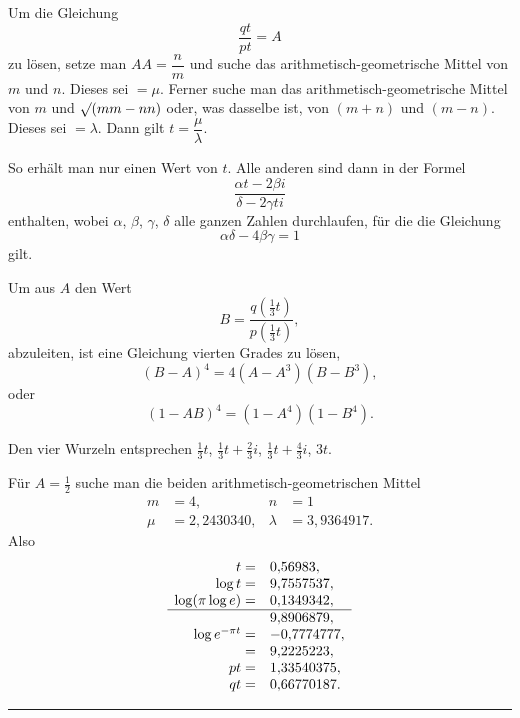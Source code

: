Um die Gleichung
\[
\frac{qt}{pt}=A
\]
zu lösen, setze man $AA=\dfrac nm$ und suche das arithmetisch-geometrische Mittel von $m$ und $n$. Dieses sei $=\mu$. Ferner suche man das arithmetisch-geometrische Mittel von $m$ und $\mathord{\surd}(mm-nn)$ oder, was dasselbe ist, von $(m+n)$ und $(m-n)$. Dieses sei $=\lambda$. Dann gilt $t=\dfrac\mu\lambda$.

So erhält man nur einen Wert von $t$. Alle anderen sind dann in der Formel
\[
\frac{\alpha t-2\beta i}{\delta-2\gamma ti}
\]
enthalten, wobei $\alpha$, $\beta$, $\gamma$, $\delta$ alle ganzen Zahlen durchlaufen, für die die Gleichung
\[
\alpha\delta-4\beta\gamma=1
\]
gilt.

Um aus $A$ den Wert
\[
B=\dfrac{q\!\left(\frac13t\right)}{p\!\left(\frac13t\right)},
\]
abzuleiten, ist eine Gleichung vierten Grades zu lösen,
\[
(B-A)^4=4(A-A^3)(B-B^3),
\]
oder
\[
(1-AB)^4=(1-A^4)(1-B^4).
\]

Den vier Wurzeln entsprechen $\frac13t$, $\frac13t+\frac23i$, $\frac13t+\frac43i$, $3t$.

Für $A=\frac12$ suche man die beiden arithmetisch-geometrischen Mittel
\[
\begin{aligned}
m&=4, & n&=1\\
\mu&=2{,}2430340, &\lambda&=3{,}9364917.
\end{aligned}
\]
Also
\[
\begin{array}{rl}
t=&0{,}56983,\\
\log t=&9{,}7557537,\\
\log(\pi\log e)=&0{,}1349342,\\\hline
&9{,}8906879,\\
\log e^{-\pi t}=&-0{,}7774777,\\
{}=&9{,}2225223,\\
pt=&1{,}33540375,\\
qt=&0{,}66770187.
\end{array}
\]
\begin{center}\rule{3cm}{.4pt}\end{center}
